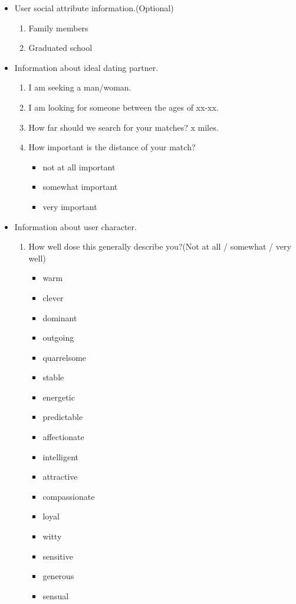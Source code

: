 \begin{appendices}
\begin{itemize}
\begin{enumerate}
		\end{enumerate}
		\item User social attribute information.(Optional)
		\begin{enumerate}
			\item Family members
			\item Graduated school
		\end{enumerate}
		\item Information about ideal dating partner.
		\begin{enumerate}
			\item I am seeking a man/woman.
			\item I am looking for someone between the ages of xx-xx.
			\item How far should we search for your matches?  x miles.
			\item How important is the distance of your match?
			\begin{itemize}
				\item not at all important
				\item somewhat important
				\item very important
			\end{itemize}
		\end{enumerate}
		\item Information about user character.
		\begin{enumerate}
			\item How well dose this generally describe you?(Not at all / somewhat / very well)
			\begin{itemize}
				\item warm
				\item clever
				\item dominant
				\item outgoing
				\item quarrelsome
				\item stable
				\item energetic
				\item predictable
				\item affectionate
				\item intelligent
				\item attractive
				\item compassionate
				\item loyal
				\item witty
				\item sensitive
				\item generous
				\item sensual

\end{itemize}
\end{enumerate}
\end{itemize}
\end{appendices}
